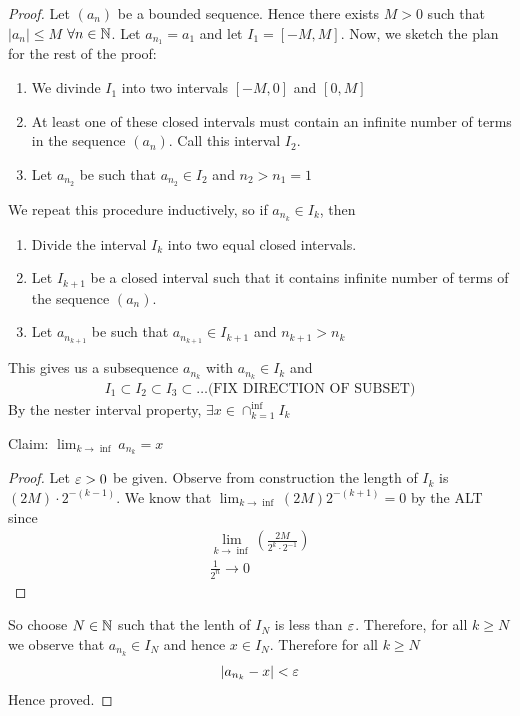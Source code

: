 \begin{proof}
	Let $\left( a_n \right) $ be a bounded sequence. Hence there exists $M > 0$ such that $\left|a_n\right| \le M$  $\forall n \in \mathbb{N}$. Let $a_{n_{1}} = a_1$ and let $I_1 = [-M, M]$. Now, we sketch the plan for the rest of the proof:
	 \begin{enumerate}
		\item We divinde $I_1$ into two intervals $[-M, 0]$ and $[0, M]$
		\item At least one of these closed intervals must contain an infinite number of terms in the sequence  $\left( a_n \right) $. Call this interval $I_2$.
		\item Let $a_{n_{2}}$ be such that $a_{n_{2}} \in I_2$ and $n_2 > n_1 = 1$
	\end{enumerate}

	We repeat this procedure inductively, so if $a_{n_{k}} \in I_k$, then

	\begin{enumerate}
		\item Divide the interval $I_k$ into two equal closed intervals.
		\item Let $I_{k+1}$ be a closed interval such that it contains infinite number of terms of the sequence $\left( a_n \right) $.
		\item Let $a_{n_{k+1}}$ be such that $a_{n_{k+1}} \in I_{k+1}$ and $n_{k+1} > n_k$
	\end{enumerate}
	This gives us a subsequence $a_{n_{k}}$ with $a_{n_{k}} \in I_k$ and 
	\begin{align}
		I_1 \subset I_2 \subset I_3 \subset \ldots \text{(FIX DIRECTION OF SUBSET)} 
	\end{align}
	By the nester interval property, $\exists x \in \cap_{k=1}^{\inf } I_k$

	Claim: $\lim_{k \to \inf } a_{n_{k}} = x$
	\begin{proof}
		Let $\e > 0$ be given. Observe from construction the length of $I_k$ is $\left( 2M \right) \cdot 2^{-\left( k-1 \right) }$. We know that $\lim_{k \to \inf } \left( 2M \right) 2^{-\left( k+1 \right) } = 0$ by the ALT since 
		\begin{align}
			\lim_{k \to \inf } \left( \frac{2M}{2^{k} \cdot 2^{-1}} \right) \\
			\frac{1}{2^{n}} \to 0
		\end{align}
	\end{proof}

	So choose $N \in \mathbb{N}$ such that the lenth of $I_N$ is less than $\e$. Therefore, for all $k \ge N$ we observe that $a_{n_{k}} \in I_{N}$ and hence $x \in I_{N}$. Therefore for all $k \ge N$
	\begin{align}
		\left|a_{n_{k}} - x\right| < \e
	\end{align}
	Hence proved.
\end{proof}


